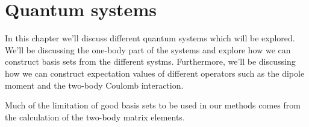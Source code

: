 \chapter{Quantum systems}
    In this chapter we'll discuss different quantum systems which will be
    explored. We'll be discussing the one-body part of the systems and explore
    how we can construct basis sets from the different systms. Furthermore,
    we'll be discussing how we can construct expectation values of different
    operators such as the dipole moment and the two-body Coulomb interaction.

    Much of the limitation of good basis sets to be used in our methods comes
    from the calculation of the two-body matrix elements.

    
    
